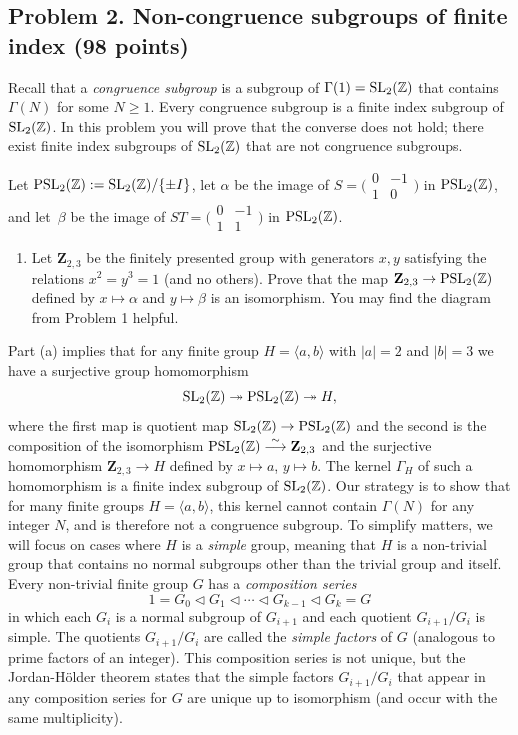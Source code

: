 \documentclass[11pt]{article}
\newcommand{\Z}{\mathbb{Z}}
\newcommand{\SL}{{\rm SL}}
\newcommand{\PSL}{{\rm PSL}}
\theoremstyle{definition}
\begin{document}
\subsection*{Problem 2. Non-congruence subgroups of finite index (98 points)}

Recall that a \emph{congruence subgroup} is a subgroup of $\Gamma(1)=\SL_2(\Z)$ that contains $\Gamma(N)$ for some $N\ge 1$.
Every congruence subgroup is a finite index subgroup of $\SL_2(\Z)$.
In this problem you will prove that the converse does not hold; there exist finite index subgroups of $\SL_2(\Z)$ that are not congruence subgroups.
\bigskip

Let $\PSL_2(\Z):=\SL_2(\Z)/\{\pm I\}$, let $\alpha$ be the image of $S=\bigl(\begin{smallmatrix}0&-1\\1&0\end{smallmatrix}\bigr)$ in $\PSL_2(\Z)$, and let~$\beta$ be the image of $ST=\bigl(\begin{smallmatrix}0&-1\\1&1\end{smallmatrix}\bigr)$ in $\PSL_2(\Z)$.

\begin{enumerate}[{\bf(a)}]
\item
Let $\mathbf{Z}_{2,3}$ be the finitely presented group with generators $x,y$ satisfying the relations $x^2=y^3=1$ (and no others).
Prove that the map $\mathbf{Z}_{2,3}\to \PSL_2(\Z)$ defined by $x\mapsto \alpha$ and $y\mapsto \beta$ is an isomorphism.  You may find the diagram from Problem 1 helpful.
\end{enumerate}

Part (a) implies that for any finite group $H=\langle a,b\rangle$ with $|a|=2$ and $|b|=3$ we have a surjective group homomorphism
\[
\SL_2(\Z)\twoheadrightarrow\PSL_2(\Z)\twoheadrightarrow H,
\]
where the first map is quotient map $\SL_2(\Z)\to\PSL_2(\Z)$ and the second is the composition of the isomorphism $\PSL_2(\Z)\overset{\sim}{\longrightarrow} \mathbf Z_{2,3}$ and the surjective homomorphism $\mathbf{Z}_{2,3}\to H$ defined by $x\mapsto a$, $y\mapsto b$.
The kernel $\Gamma_H$ of such a homomorphism is a finite index subgroup of $\SL_2(\Z)$.
Our strategy is to show that for many finite groups $H=\langle a,b\rangle$, this kernel cannot contain $\Gamma(N)$ for any integer $N$, and is therefore not a congruence subgroup.
To simplify matters, we will focus on cases where $H$ is a \emph{simple} group, meaning that $H$ is a non-trivial group that contains no normal subgroups other than the trivial group and itself.
Every non-trivial finite group $G$ has a \emph{composition series}
\[
1=G_0 \triangleleft G_1\triangleleft \cdots\triangleleft G_{k-1}\triangleleft G_k = G
\]
in which each $G_i$ is a normal subgroup of $G_{i+1}$ and each quotient $G_{i+1}/G_i$ is simple.
The quotients $G_{i+1}/G_i$ are called the \emph{simple factors} of $G$ (analogous to prime factors of an integer).
This composition series is not unique, but the Jordan-H\"older theorem states that the simple factors $G_{i+1}/G_i$ that appear in any composition series for $G$ are unique up to isomorphism (and occur with the same multiplicity).
\end{document}
